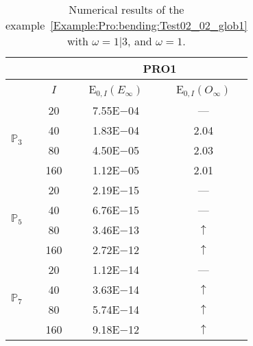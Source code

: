 \begin{table}[H]
\caption{Numerical results of the example~\ref{Example:Pro:bending:Test02_02_glob1} with $\omega=1|3$, and $\omega=1$.}
\setlength{\tabcolsep}{5pt}
\centering
\begin{tabular}{@{}l c c c@{}}
\toprule
 &  & \multicolumn{2}{c}{PRO1}\\
\midrule
 & $I$ & E$_{0,I}(E_{\infty})$ & E$_{0,I}(O_{\infty})$\\
\midrule
\multirow{4}{*}{$\mathbb{P}_{3}$} & 20 & 7.55E$-$04 & ---\\
 & 40 & 1.83E$-$04 & 2.04\\
 & 80 & 4.50E$-$05 & 2.03\\
 & 160 & 1.12E$-$05 & 2.01\\
\midrule
\multirow{4}{*}{$\mathbb{P}_{5}$} & 20 & 2.19E$-$15 & ---\\
 & 40 & 6.76E$-$15 & ---\\
 & 80 & 3.46E$-$13 & $\uparrow$\\
 & 160 & 2.72E$-$12 & $\uparrow$\\
\midrule
\multirow{4}{*}{$\mathbb{P}_{7}$} & 20 & 1.12E$-$14 & ---\\
 & 40 & 3.63E$-$14 & $\uparrow$\\
 & 80 & 5.74E$-$14 & $\uparrow$\\
 & 160 & 9.18E$-$12 & $\uparrow$\\
\bottomrule
\end{tabular}
\label{Table:PRO:test_02_02_test2}
\end{table}
